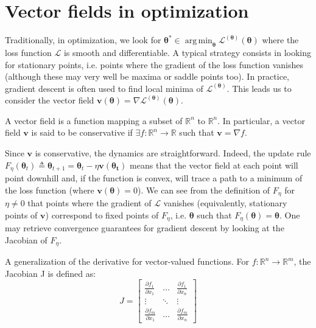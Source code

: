 \documentclass{article}
\DeclareMathOperator*{\argmin}{arg\,min}
\renewcommand{\vec}[1]{\ensuremath{\boldsymbol{#1}}}
\newcommand{\btheta}[0]{\ensuremath{\boldsymbol{\theta}}}
\begin{document}
\section{Vector fields in optimization}
Traditionally, in optimization, we look for $\btheta^* \in \argmin_{\btheta}\mathcal{L}^{(\btheta)}(\btheta)$ where the loss function $\mathcal{L}$ is smooth and differentiable. A typical strategy consists in looking for stationary points, i.e. points where the gradient of the loss function vanishes (although these may very well be maxima or saddle points too). In practice, gradient descent is often used to find local minima of $\mathcal{L}^{(\btheta)}$. This leads us to consider the vector field $\vec{v}(\btheta)=\nabla\mathcal{L}^{(\btheta)}(\btheta)$.
\begin{defn}
    A vector field is a function mapping a subset of $\mathbb{R}^n$ to $\mathbb{R}^n$. In particular, a vector field $\vec{v}$ is said to be conservative if $\exists f: \mathbb{R}^n \rightarrow \mathbb{R}$ such that $\vec{v} = \nabla f$.
\end{defn}

Since $\vec{v}$ is conservative, the dynamics are straightforward. Indeed, the update rule $F_\eta(\btheta_t) \triangleq \btheta_{t+1} = \btheta_t - \eta \vec{v}(\vec{\btheta_t})$ means that the vector field at each point will point downhill and, if the function is convex, will trace a path to a minimum of the loss function (where $\vec{v}(\btheta) = 0$). We can see from the definition of $F_\eta$ for $\eta \neq 0$ that points where the gradient of $\mathcal{L}$ vanishes (equivalently, stationary points of $\vec{v}$) correspond to fixed points of $F_\eta$, i.e. $\btheta$ such that $F_\eta(\btheta) = \btheta$. One may retrieve convergence guarantees for gradient descent by looking at the Jacobian of $F_\eta$.

\begin{defn}[Jacobian] A generalization of the derivative for vector-valued functions. For $f: \mathbb{R}^n \rightarrow \mathbb{R}^m$, the Jacobian J is defined as:
\[
    J = 
    \begin{bmatrix} 
        \frac{\partial f_1}{\partial x_1} & \dots & \frac{\partial f_1}{\partial x_n} \\
        \vdots & \ddots & \vdots \\
        \frac{\partial f_m}{\partial x_1} & \dots & \frac{\partial f_m}{\partial x_n} 
    \end{bmatrix}
\]
\end{defn} 
\end{document}
